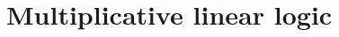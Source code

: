 \documentclass[usenames,dvipsnames]{beamer}
\begin{document}

\section{Multiplicative linear logic}
\end{document}
